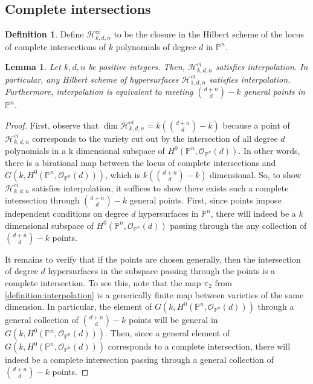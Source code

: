 \documentclass[reqno, 11pt]{amsart}
\theoremstyle{definition}
\theoremstyle{remark}
\numberwithin{equation}{section}
\numberwithin{thm}{section}
\numberwithin{prop}{section}
\numberwithin{lem}{section}
\numberwithin{cor}{section}
\numberwithin{conj}{section}
\numberwithin{defn}{section}
\theoremstyle{plain}
\newtheorem{lemma}[theorem]{Lemma}
\theoremstyle{definition}
\newtheorem{definition}[theorem]{Definition}
\newcommand\bp{{\mathbb P}}
\newcommand\sch{\mathscr H}
\newcommand\sco{\mathscr O}
\newcommand \ci[3]{\sch^{ci}_{#1, #2, #3}}
\begin{document}
\subsection{Complete intersections}

\begin{definition}
	\label{definition:}
	Define $\ci k d n$ to be the closure in the 
	Hilbert scheme of the locus of complete intersections
	of $k$ polynomials of degree $d$ in $\bp^n$.
\end{definition}

\begin{lemma}
	\label{lemma:balanced-complete-intersection}
	Let $k, d, n$ be positive integers.
	Then, $\ci k d n$ satisfies interpolation.
	In particular, any Hilbert scheme of hypersurfaces
	$\ci 1 d n$
	satisfies interpolation.
	Furthermore, interpolation
	is equivalent to meeting $\binom{d+n}{d}-k$
	general points in $\bp^n$.
\end{lemma}
\begin{proof}
	First, observe that $\dim \ci k d n = k(\binom{d+ n}{d} - k)$
	because a point of $\ci k d n$ corresponds to the
	variety cut out by the intersection of all degree $d$ polynomials
	in a k dimensional subspace of $H^0(\bp^n, \sco_{\bp^n}(d))$.
	In other words, there is a birational map between
	the locus of complete intersections and $G(k, H^0(\bp^n, \sco_{\bp^n}(d)))$,
	which is $k(\binom{d+n}{d}-k)$ dimensional.
	So, to show $\ci k d n$ satisfies interpolation, it suffices
	to show there exists such a complete intersection through
	$\binom{d + n}{d} - k$ general points.
	First, since points impose independent conditions on
	degree $d$ hypersurfaces in $\bp^n$, there will indeed be a $k$
	dimensional subspace of $H^0(\bp^n, \sco_{\bp^n}(d))$
	passing through the any collection
	of $\binom{d+n}{d} - k$ points.

	It remains to verify that if the points are chosen
	generally, then the intersection of degree
	$d$ hypersurfaces in the subspace passing through
	the points is a complete intersection.
	To see this, note that the map $\pi_2$
	from \autoref{definition:interpolation}
	is a generically finite map between varieties of
	the same dimension. In particular,
	the element of	
	$G(k, H^0(\bp^n, \sco_{\bp^n}(d)))$
	through a general collection of
	$\binom{d+n}{d}-k$ points
	will be general in
	$G(k, H^0(\bp^n, \sco_{\bp^n}(d)))$.
	Then, since a general element of 
	$G(k, H^0(\bp^n, \sco_{\bp^n}(d)))$
	corresponds to a complete intersection,
	there will indeed be a complete intersection
	passing through a general collection of
	$\binom{d+n}{d}-k$ points.
\end{proof}







\end{document}
